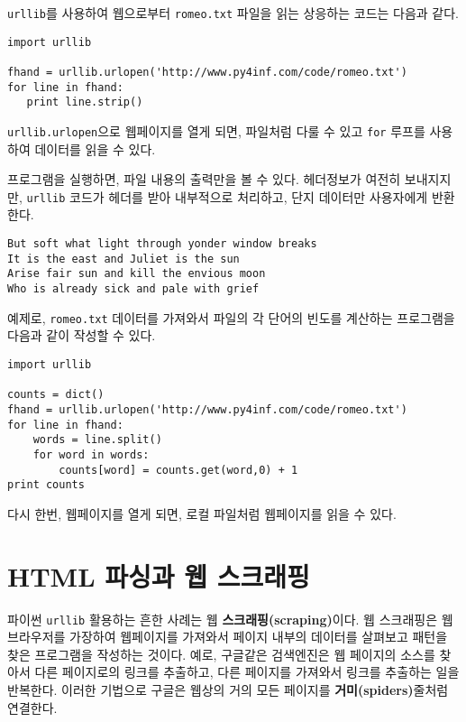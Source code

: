 {\tt urllib}를 사용하여 웹으로부터 {\tt romeo.txt} 파일을 읽는 상응하는 코드는 다음과 같다.

\beforeverb
\begin{verbatim}
import urllib

fhand = urllib.urlopen('http://www.py4inf.com/code/romeo.txt')
for line in fhand:
   print line.strip()
\end{verbatim}
\afterverb
%

{\tt urllib.urlopen}으로 웹페이지를 열게 되면, 파일처럼 다룰 수 있고 {\tt for} 루프를 사용하여 데이터를 읽을 수 있다.

프로그램을 실행하면, 파일 내용의 출력만을 볼 수 있다. 헤더정보가 여전히 보내지지만, {\tt urllib} 코드가 헤더를 받아 내부적으로 처리하고,
단지 데이터만 사용자에게 반환한다.

\beforeverb
\begin{verbatim}
But soft what light through yonder window breaks
It is the east and Juliet is the sun
Arise fair sun and kill the envious moon
Who is already sick and pale with grief
\end{verbatim}
\afterverb
%

예제로, {\tt romeo.txt} 데이터를 가져와서 파일의 각 단어의 빈도를 계산하는 프로그램을 다음과 같이 작성할 수 있다.

\beforeverb
\begin{verbatim}
import urllib

counts = dict()
fhand = urllib.urlopen('http://www.py4inf.com/code/romeo.txt')
for line in fhand:
    words = line.split()
    for word in words:
        counts[word] = counts.get(word,0) + 1   
print counts
\end{verbatim}
\afterverb
%

다시 한번, 웹페이지를 열게 되면, 로컬 파일처럼 웹페이지를 읽을 수 있다.

\section{HTML 파싱과 웹 스크래핑}


파이썬 {\tt urllib} 활용하는 흔한 사례는 웹 {\bf 스크래핑(scraping)}이다.
웹 스크래핑은 웹브라우저를 가장하여 웹페이지를 가져와서 페이지 내부의 데이터를 살펴보고 패턴을 찾은 프로그램을 작성하는 것이다.
예로, 구글같은 검색엔진은 웹 페이지의 소스를 찾아서 다른 페이지로의 링크를 추출하고, 다른 페이지를 가져와서 링크를 추출하는 일을 반복한다.
이러한 기법으로 구글은 웹상의 거의 모든 페이지를 {\bf 거미(spiders)}줄처럼 연결한다.

